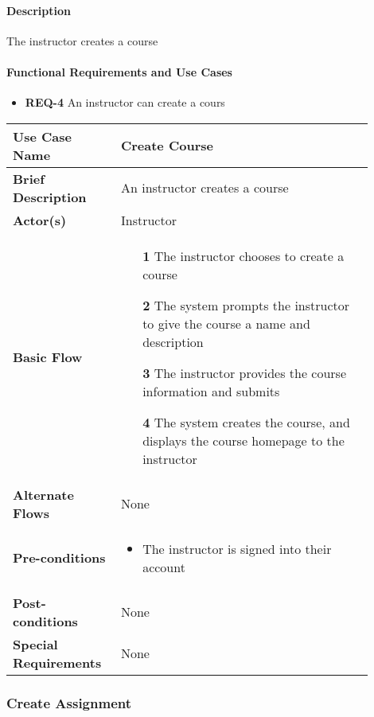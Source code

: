 \documentclass{article}
\begin{document}
\paragraph{Description} The instructor creates a course

\paragraph{Functional Requirements and Use Cases}
\begin{itemize}
  \item \textbf{REQ-4} An instructor can create a cours
\end{itemize}

\vspace{0.1in}

\begin{tabular}{| p{0.25\linewidth} | p{0.65\linewidth} |}
  \hline
  \textbf{Use Case Name} & Create Course \\
  \hline
  \textbf{Brief Description} & An instructor creates a course \\
  \hline
  \textbf{Actor(s)} & Instructor \\
  \hline
  \textbf{Basic Flow} & \begin{itemize}
    \item[\textbf{1}] The instructor chooses to create a course
    \item[\textbf{2}] The system prompts the instructor to give the course a name and description
    \item[\textbf{3}] The instructor provides the course information and submits
    \item[\textbf{4}] The system creates the course, and displays the course homepage to the instructor
  \end{itemize}\\
  \hline
  \textbf{Alternate Flows} & None \\
  \hline
  \textbf{Pre-conditions} & \begin{itemize}
    \item The instructor is signed into their account
  \end{itemize} \\
  \hline
  \textbf{Post-conditions} & None \\
  \hline
  \textbf{Special Requirements} & None \\
  \hline
\end{tabular}


\subsubsection{Create Assignment}
\end{document}
